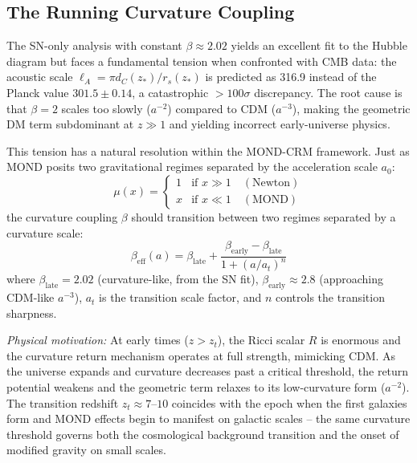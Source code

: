\documentclass[aps,prd,twocolumn,superscriptaddress,nofootinbib]{revtex4-2}
\begin{document}
\subsection{The Running Curvature Coupling}
\label{subsec:running_beta}

The SN-only analysis with constant $\beta \approx 2.02$ yields an excellent fit to the Hubble diagram but faces a fundamental tension when confronted with CMB data: the acoustic scale $\ell_A = \pi d_C(z_*)/r_s(z_*)$ is predicted as 316.9 instead of the Planck value $301.5 \pm 0.14$, a catastrophic $>100\sigma$ discrepancy. The root cause is that $\beta = 2$ scales too slowly ($a^{-2}$) compared to CDM ($a^{-3}$), making the geometric DM term subdominant at $z \gg 1$ and yielding incorrect early-universe physics.

This tension has a natural resolution within the MOND-CRM framework. Just as MOND posits two gravitational regimes separated by the acceleration scale $a_0$:
\begin{equation}
\mu(x) = \begin{cases} 1 & \text{if } x \gg 1 \quad (\text{Newton}) \\ x & \text{if } x \ll 1 \quad (\text{MOND}) \end{cases}
\end{equation}
the curvature coupling $\beta$ should transition between two regimes separated by a curvature scale:
\begin{equation}
\beta_{\mathrm{eff}}(a) = \beta_{\mathrm{late}} + \frac{\beta_{\mathrm{early}} - \beta_{\mathrm{late}}}{1 + (a/a_t)^n}
\label{eq:running_beta}
\end{equation}
where $\beta_{\mathrm{late}} = 2.02$ (curvature-like, from the SN fit), $\beta_{\mathrm{early}} \approx 2.8$ (approaching CDM-like $a^{-3}$), $a_t$ is the transition scale factor, and $n$ controls the transition sharpness.

\textit{Physical motivation:} At early times ($z > z_t$), the Ricci scalar $R$ is enormous and the curvature return mechanism operates at full strength, mimicking CDM. As the universe expands and curvature decreases past a critical threshold, the return potential weakens and the geometric term relaxes to its low-curvature form ($a^{-2}$). The transition redshift $z_t \approx 7\text{--}10$ coincides with the epoch when the first galaxies form and MOND effects begin to manifest on galactic scales -- the same curvature threshold governs both the cosmological background transition and the onset of modified gravity on small scales.
\end{document}
